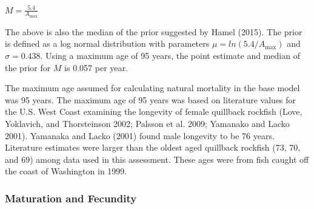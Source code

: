 \documentclass[11pt,
  english,
  a4paper,
]{article}
\begin{document}
\leavevmode\tagmcend\tagstructend\par

\begin{centering}

$M=\frac{5.4}{A_{\text{max}}}$

\end{centering}


The above is also the median of the prior suggested by Hamel {(2015)\leavevmode\tagmcend\tagstructend}. The prior is defined as a log normal distribution with parameters {\(\mu = ln(5.4/A_{\text{max}})\)\leavevmode\tagmcend\tagstructend} and {\(\sigma = 0.438\)\leavevmode\tagmcend\tagstructend}. Using a maximum age of 95 years, the point estimate and median of the prior for {\(M\)\leavevmode\tagmcend\tagstructend} is 0.057 per year.

\leavevmode\tagmcend\tagstructend\par


The maximum age assumed for calculating natural mortality in the base model was 95 years. The maximum age of 95 years was based on literature values for the U.S. West Coast examining the longevity of female quillback rockfish {(Love, Yoklavich, and Thorsteinson 2002; Palsson et al. 2009; Yamanako and Lacko 2001)\leavevmode\tagmcend\tagstructend}. Yamanaka and Lacko {(2001)\leavevmode\tagmcend\tagstructend} found male longevity to be 76 years. Literature estimates were larger than the oldest aged quillback rockfish (73, 70, and 69) among data used in this assessment. These ages were from fish caught off the coast of Washington in 1999.

\leavevmode\tagmcend\tagstructend\par


\hypertarget{maturation-and-fecundity}{%
\subsubsection{Maturation and Fecundity}\label{maturation-and-fecundity}}
\end{document}
